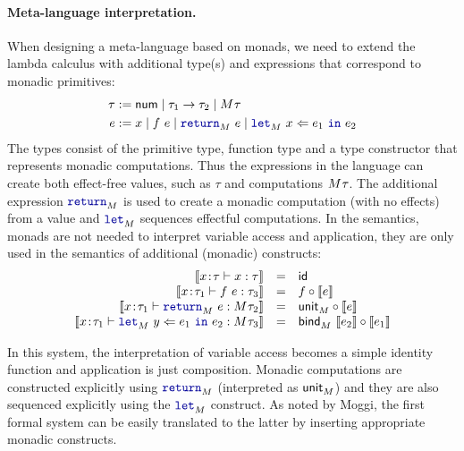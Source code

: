 
\paragraph{Meta-language interpretation.} When designing a meta-language based on monads, we need to
extend the lambda calculus with additional type(s) and expressions that correspond to monadic
primitives:
%
\begin{align*}
\tau &:= \ident{num} \sep \tau_1 \rightarrow \tau_2 \sep \mtyp{}{\tau} \\
   e &:= x \sep f~e \sep \kvd{return}_\mtyp{}{}~e \sep \kvd{let}_\mtyp{}{}~x \Leftarrow e_1~\kvd{in}~e_2
\end{align*}
%
The types consist of the primitive type, function type and a type constructor that
represents monadic computations. Thus the expressions in the language can create both
effect-free values, such as $\tau$ and computations $M^{}\tau$. The additional expression
$\kvd{return}_\mtyp{}{}$ is used to create a monadic computation (with no effects) from a
value and $\kvd{let}_\mtyp{}{}$ sequences effectful computations. In the semantics,
monads are not needed to interpret variable access and application, they are only used in the
semantics of additional (monadic) constructs:
%
\begin{equation*}
\begin{array}{rcl}
\sem{x\!:\!\tau \vdash x : \tau} &=& \idf{}\\
\sem{x\!:\!\tau_1 \vdash f~e : \tau_3} &=& f \circ \sem{e}\\
\sem{x\!:\!\tau_1 \vdash \kvd{return}_\mtyp{}{}~e : \mtyp{}{\tau_2}} &=& \ident{unit}_\mtyp{}{} \circ \sem{e}\\
\sem{x\!:\!\tau_1 \vdash \kvd{let}_\mtyp{}{}~y \Leftarrow e_1~\kvd{in}~e_2 : \mtyp{}{\tau_3}} &=&
  \ident{bind}_\mtyp{}{}~\sem{e_2} \circ \sem{e_1}
\end{array}
\end{equation*}

\noindent
In this system, the interpretation of variable access becomes a simple identity function and
application is just composition. Monadic computations are constructed explicitly using
$\kvd{return}_\mtyp{}{}$ (interpreted as $\textnormal{\sffamily unit}_M^{}$) and they are also sequenced
explicitly using the $\kvd{let}_\mtyp{}{}$ construct. As noted by Moggi, the first formal system
can be easily translated to the latter by inserting appropriate monadic constructs.

